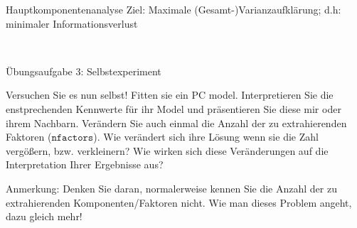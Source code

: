 \documentclass[
  ignorenonframetext,
]{beamer}
\newenvironment{Shaded}{\begin{snugshade}}{\end{snugshade}}
\newcommand{\AttributeTok}[1]{\textcolor[rgb]{0.77,0.63,0.00}{#1}}
\newcommand{\CommentTok}[1]{\textcolor[rgb]{0.56,0.35,0.01}{\textit{#1}}}
\newcommand{\ConstantTok}[1]{\textcolor[rgb]{0.00,0.00,0.00}{#1}}
\newcommand{\DecValTok}[1]{\textcolor[rgb]{0.00,0.00,0.81}{#1}}
\newcommand{\DocumentationTok}[1]{\textcolor[rgb]{0.56,0.35,0.01}{\textbf{\textit{#1}}}}
\newcommand{\FunctionTok}[1]{\textcolor[rgb]{0.00,0.00,0.00}{#1}}
\newcommand{\NormalTok}[1]{#1}
\newcommand{\OtherTok}[1]{\textcolor[rgb]{0.56,0.35,0.01}{#1}}
\newcommand{\SpecialCharTok}[1]{\textcolor[rgb]{0.00,0.00,0.00}{#1}}
\newcommand{\StringTok}[1]{\textcolor[rgb]{0.31,0.60,0.02}{#1}}
\begin{document}
\begin{frame}[fragile]{Hauptkomponentenanalyse}
\protect\hypertarget{hauptkomponentenanalyse}{}
Ziel: Maximale (Gesamt-)Varianzaufklärung; d.h: minimaler
Informationsverlust

~

\begin{Shaded}
\end{Shaded}
\end{frame}

\begin{frame}{Übungsaufgabe 3: Selbstexperiment}
\protect\hypertarget{uxfcbungsaufgabe-3-selbstexperiment}{}
\begin{example}
Versuchen Sie es nun selbst! Fitten sie ein PC model. Interpretieren Sie die
enstprechenden Kennwerte für ihr Model und präsentieren Sie diese mir oder ihrem
Nachbarn. Verändern Sie auch einmal die Anzahl der zu extrahierenden Faktoren
($\texttt{nfactors}$). Wie verändert sich ihre Lösung wenn sie die Zahl
vergößern, bzw. verkleinern? Wie wirken sich diese Veränderungen auf die
Interpretation Ihrer Ergebnisse aus? 
\end{example}

Anmerkung: Denken Sie daran, normalerweise kennen Sie die Anzahl der zu
extrahierenden Komponenten/Faktoren nicht. Wie man dieses Problem
angeht, dazu gleich mehr!
\end{frame}
\end{document}
